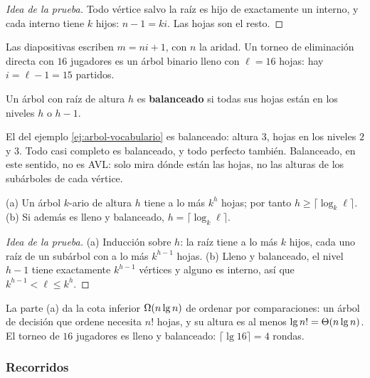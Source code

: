 \documentclass[11pt,letterpaper]{article}
\begin{document}
\begin{proof}[Idea de la prueba]
  Todo vértice salvo la raíz es hijo de exactamente un interno, y cada
  interno tiene $k$ hijos: $n - 1 = ki$. Las hojas son el resto.
\end{proof}

Las diapositivas escriben $m = ni + 1$, con $n$ la aridad. Un torneo
de eliminación directa con $16$ jugadores es un árbol binario lleno
con $\ell = 16$ hojas: hay $i = \ell - 1 = 15$ partidos.

\begin{definicion}
  Un árbol con raíz de altura $h$ es \textbf{balanceado} si todas sus
  hojas están en los niveles $h$ o $h - 1$.
\end{definicion}

El del ejemplo \ref{ej:arbol-vocabulario} es balanceado: altura $3$,
hojas en los niveles $2$ y $3$. Todo casi completo es balanceado, y
todo perfecto también. Balanceado, en este sentido, no es AVL: solo
mira dónde están las hojas, no las alturas de los subárboles de cada
vértice.

\begin{teorema}
  \label{teo:arbol-altura}
  (a) Un árbol $k$-ario de altura $h$ tiene a lo más $k^h$ hojas;
  por tanto $h \ge \lceil \log_k \ell \rceil$. (b) Si además es lleno
  y balanceado, $h = \lceil \log_k \ell \rceil$.
\end{teorema}

\begin{proof}[Idea de la prueba]
  (a) Inducción sobre $h$: la raíz tiene a lo más $k$ hijos, cada uno
  raíz de un subárbol con a lo más $k^{h-1}$ hojas. (b) Lleno y
  balanceado, el nivel $h - 1$ tiene exactamente $k^{h-1}$ vértices y
  alguno es interno, así que $k^{h-1} < \ell \le k^h$.
\end{proof}

La parte (a) da la cota inferior $\Omega\!\left(n \lg n\right)$ de ordenar por
comparaciones: un árbol de decisión que ordene necesita $n!$ hojas, y
su altura es al menos $\lg n! = \Theta\!\left(n \lg n\right)$. El torneo de $16$
jugadores es lleno y balanceado: $\lceil \lg 16 \rceil = 4$ rondas.


\subsubsection*{Recorridos}
\end{document}
